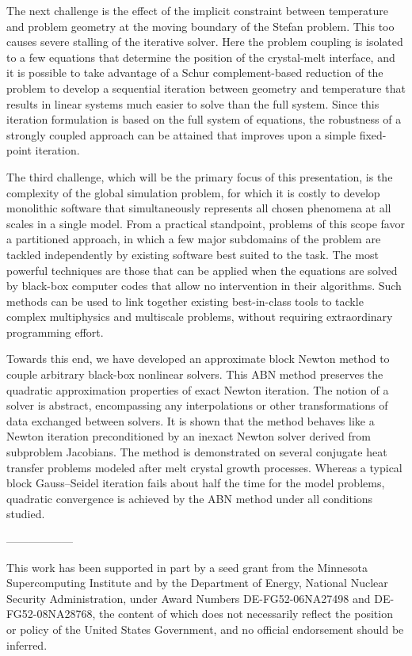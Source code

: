 \documentclass{report}
\begin{document}
The next challenge is the effect of the implicit constraint between
temperature and problem geometry at the moving boundary of the Stefan
problem. This too causes severe stalling of the iterative solver. Here
the problem coupling is isolated to a few equations that determine the
position of the crystal-melt interface, and it is possible to take
advantage of a Schur complement-based reduction of the problem to develop
a sequential iteration between geometry and temperature that results in
linear systems much easier to solve than the full system. Since this
iteration formulation is based on the full system of equations, the
robustness of a strongly coupled approach can be attained that improves
upon a simple fixed-point iteration.

The third challenge, which will be the primary focus of this
presentation, is the complexity of the global simulation problem, for
which it is costly to develop monolithic software that simultaneously
represents all chosen phenomena at all scales in a single model. From a
practical standpoint, problems of this scope favor a partitioned
approach, in which a few major subdomains of the problem are tackled
independently by existing software best suited to the task. The most
powerful techniques are those that can be applied when the equations are
solved by black-box computer codes that allow no intervention in their
algorithms. Such methods can be used to link together existing
best-in-class tools to tackle complex multiphysics and multiscale
problems, without requiring extraordinary programming effort.

Towards this end, we have developed an approximate block Newton method to
couple arbitrary black-box nonlinear solvers. This ABN method preserves
the quadratic approximation properties of exact Newton iteration. The
notion of a solver is abstract, encompassing any interpolations or other
transformations of data exchanged between solvers. It is shown that the
method behaves like a Newton iteration preconditioned by an inexact
Newton solver derived from subproblem Jacobians. The method is
demonstrated on several conjugate heat transfer problems modeled after
melt crystal growth processes. Whereas a typical block Gauss--Seidel
iteration fails about half the time for the model problems, quadratic
convergence is achieved by the ABN method under all conditions studied.

------------------

This work has been supported in part by a seed grant from the Minnesota
Supercomputing Institute and by the Department of Energy, National
Nuclear Security Administration, under Award Numbers DE-FG52-06NA27498
and DE-FG52-08NA28768, the content of which does not necessarily reflect
the position or policy of the United States Government, and no official
endorsement should be inferred.
\end{document}
